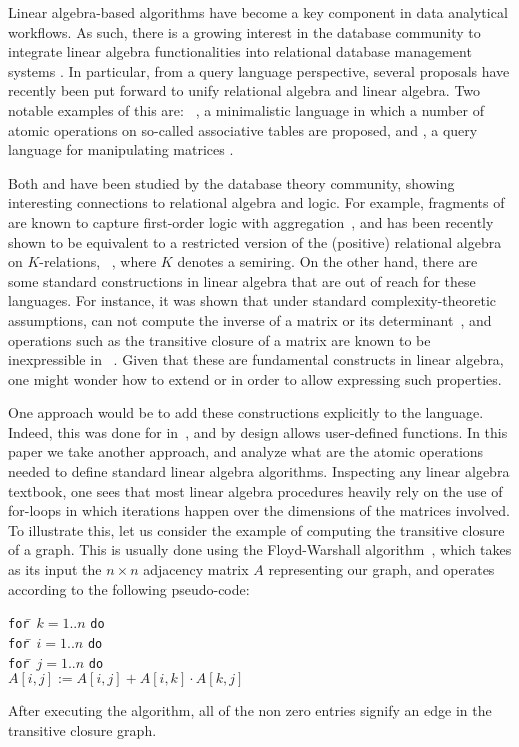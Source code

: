 Linear algebra-based algorithms have become a key component in data analytical workflows. As such, there is a growing interest in the database community to integrate linear algebra functionalities into relational database management systems \cite{Jermaine/17/LAonRA,2019Boehm,LARA_Berlin_2016,JankovLYCZJG19,Khamis0NOS18}. In particular, from a query language perspective, several proposals have recently been put forward to unify relational algebra and linear algebra. Two notable examples of this are: \lara~\cite{HutchisonHS17}, a minimalistic language in which a number of atomic operations on so-called associative tables are proposed, and \lang, a query language for manipulating matrices \cite{matlang-journal}.

Both \lara and \lang have been studied by the database theory community, showing interesting connections to relational algebra and logic. For example, fragments of \lara are known to capture first-order logic with aggregation~\cite{BarceloH0S20}, and \lang has been recently shown to be equivalent to a restricted version of the (positive) relational algebra on $K$-relations, \rak~\cite{brijder2019matrices}, where $K$ denotes a semiring. On the other hand, there are some standard constructions in linear algebra that are out of reach for these languages. For instance, it was shown that under standard complexity-theoretic assumptions, \lara can not compute the inverse of a matrix or its determinant~\cite{BarceloH0S20}, and operations such as the transitive closure of a matrix are known to be inexpressible in \lang~\cite{matlang-journal}. Given that these are fundamental constructs in linear algebra, one might wonder how to extend \lara or \lang in order to allow expressing such properties.

One approach would be to add these constructions explicitly to the language. Indeed, this was done for \lang in~\cite{matlang-journal}, and \lara by design allows user-defined functions. In this paper we take another approach, and analyze what are the atomic operations needed to define standard linear algebra algorithms. Inspecting any linear algebra textbook, one sees that most linear algebra procedures heavily rely on the use of for-loops in which iterations happen over the dimensions of the matrices involved. To illustrate this, let us consider the example of computing the transitive closure of a graph. This is usually done using  the Floyd-Warshall algorithm~\cite{cormen}, which takes as its input the $n\times n$ adjacency matrix $A$ representing our graph, and operates according to the following pseudo-code:
\vspace{-1ex}
\begin{tabbing}
\quad\texttt{for}\=\,  $k = 1..n$ \texttt{do}\\
\> \texttt{for}\=\,  $i = 1..n$ \texttt{do}\\
\> \> \texttt{for}\=\,  $j = 1..n$ \texttt{do}\\
\> \> \> $A[i,j] := A[i,j] + A[i,k]\cdot A[k,j]$
\end{tabbing}
\vspace{-1ex}
After executing the algorithm, all of the non zero entries signify an edge in the transitive closure graph. 

